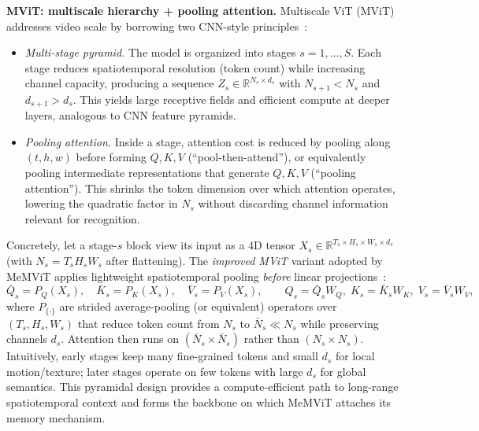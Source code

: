 \begin{enrichment}
\begin{enrichment}
        \medskip
        \textbf{MViT: multiscale hierarchy + pooling attention.}
        Multiscale ViT (MViT) addresses video scale by borrowing two CNN-style principles~\cite{fan2021_mvit,li2021_improved_mvit}:
        \begin{itemize}
            \item \emph{Multi-stage pyramid.} The model is organized into stages $s=1,\dots,S$. Each stage reduces spatiotemporal resolution (token count) while increasing channel capacity, producing a sequence $Z_s\!\in\!\mathbb{R}^{N_s\times d_s}$ with $N_{s+1}\!<\!N_s$ and $d_{s+1}\!>\!d_s$. This yields large receptive fields and efficient compute at deeper layers, analogous to CNN feature pyramids.
            \item \emph{Pooling attention.} Inside a stage, attention cost is reduced by pooling along $(t,h,w)$ before forming $Q,K,V$ (``pool-then-attend''), or equivalently pooling intermediate representations that generate $Q,K,V$ (``pooling attention''). This shrinks the token dimension over which attention operates, lowering the quadratic factor in $N_s$ without discarding channel information relevant for recognition.
        \end{itemize}
        Concretely, let a stage-$s$ block view its input as a 4D tensor $X_s\!\in\!\mathbb{R}^{T_s\times H_s\times W_s\times d_s}$ (with $N_s\!=\!T_sH_sW_s$ after flattening). The \emph{improved MViT} variant adopted by MeMViT applies lightweight spatiotemporal pooling \emph{before} linear projections~\cite{li2021_improved_mvit}:
        \begin{equation}
            \bar Q_s = P_Q(X_s),\quad \bar K_s = P_K(X_s),\quad \bar V_s = P_V(X_s),\qquad
            Q_s = \bar Q_s W_Q,\; K_s = \bar K_s W_K,\; V_s = \bar V_s W_V,
            \label{eq:memvit_pool_then_linear}
        \end{equation}
        where $P_{\{\cdot\}}$ are strided average-pooling (or equivalent) operators over $(T_s,H_s,W_s)$ that reduce token count from $N_s$ to $\bar N_s\!\ll\!N_s$ while preserving channels $d_s$. Attention then runs on $(\bar N_s\times \bar N_s)$ rather than $(N_s\times N_s)$. Intuitively, early stages keep many fine-grained tokens and small $d_s$ for local motion/texture; later stages operate on few tokens with large $d_s$ for global semantics. This pyramidal design provides a compute-efficient path to long-range spatiotemporal context and forms the backbone on which MeMViT attaches its memory mechanism.
        
        \newpage
        

\end{enrichment}
\end{enrichment}
